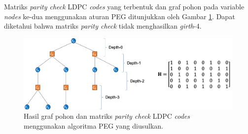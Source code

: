 Matriks \textit{parity check} LDPC \textit{codes} yang terbentuk dan graf pohon pada variable \textit{nodes} ke-dua menggunakan aturan PEG ditunjukkan oleh Gambar \ref{fig:PEGM}. Dapat diketahui bahwa matriks \textit{parity check} tidak menghasilkan \textit{girth}-4.
\begin{figure}[tb]
	\centering 
	\hspace{-1.2cm}
	\includegraphics[width=1\textwidth]{pics/withmatlabpeg2}
	\centering 
	\caption{Hasil graf pohon dan matriks \textit{parity check} LDPC \textit{codes} menggunakan algoritma PEG yang diusulkan.}
	\label{fig:PEGM}
\end{figure}

